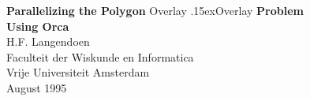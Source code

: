  

\begin{titlepage}
\vspace*{0.3cm}
\hspace{2cm}
\parbox{10cm}{
  \begin{small}
    \begin{center}
      {\large
        {\bf Parallelizing the Polygon}
        Overlay \hspace{-8.3ex}\raise.15ex\hbox{Overlay}
        {\bf Problem \\ Using Orca}
      } \\
      \vspace{0.5cm}
      H.F. Langendoen\\
      Faculteit der Wiskunde en Informatica \\
      Vrije Universiteit Amsterdam \\
      \vspace{0.5cm}
      August 1995
    \end{center}
  \end{small}
}
\end{titlepage}

